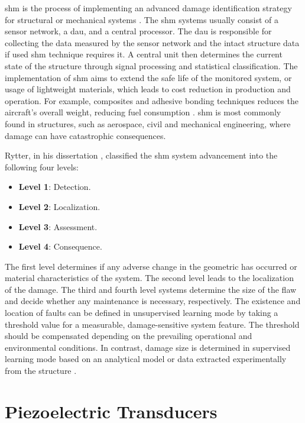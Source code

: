 \documentclass[11pt,a4paper,final]{report}
\begin{document}
\Ac{shm} is the process of implementing an advanced damage identification strategy for structural or mechanical systems \cite{farrar2007introduction}.
The \ac{shm} systems usually consist of a sensor network, a \ac{dau}, and a central processor.
The \ac{dau} is responsible for collecting the data measured by the sensor network and the intact structure data if used \ac{shm} technique requires it.
A central unit then determines the current state of the structure through signal processing and statistical classification.
The implementation of \ac{shm} aims to extend the safe life of the monitored system, or usage of lightweight materials, which leads to cost reduction in production and operation.
For example, composites and adhesive bonding techniques reduces the aircraft's overall weight, reducing fuel consumption \cite{scelsi2011potential}.
\ac{shm} is most commonly found in structures, such as aerospace, civil and mechanical engineering, where damage can have catastrophic consequences.

Rytter, in his dissertation \cite{rytter1993vibrational}, classified the \ac{shm} system advancement into the following four levels:
\begin{itemize}
	\item[] \textbf{Level 1}: Detection.
	\item[] \textbf{Level 2}: Localization.
	\item[] \textbf{Level 3}: Assessment.
	\item[] \textbf{Level 4}: Consequence.
\end{itemize}
The first level determines if any adverse change in the geometric has occurred or material characteristics of the system. The second level leads to the localization of the damage.
The third and fourth level systems determine the size of the flaw and decide whether any maintenance is necessary, respectively.
The existence and location of faults can be defined in unsupervised learning mode by taking a threshold value for a measurable, damage-sensitive system feature. The threshold should be compensated depending on the prevailing operational and environmental conditions.
In contrast, damage size is determined in supervised learning mode based on an analytical model or data extracted experimentally from the structure \cite{worden2007fundamental}. \section{Piezoelectric Transducers}
\label{sec:PZT}
\end{document}
